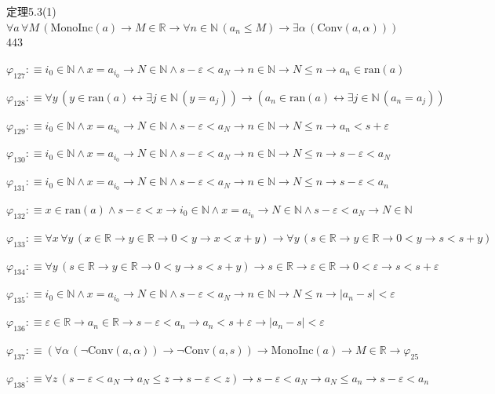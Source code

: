 \begin{fullproof}{定理5.3(1)}{$\forall a\,\forall M\,(\mathrm{MonoInc}(a) \to M \in \mathbb{R} \to \forall n \in \mathbb{N}\,(a_{n} \leq M) \to \exists \alpha\,(\mathrm{Conv}(a,\alpha)))$}{443}
\begin{abbrevlist}
\item $\varphi_{127} :\equiv i_{0} \in \mathbb{N} \land x = a_{i_{0}} \to N \in \mathbb{N} \land s - \varepsilon < a_{N} \to n \in \mathbb{N} \to N \leq n \to a_{n} \in \mathrm{ran}(a)$
\item $\varphi_{128} :\equiv \forall y\,(y \in \mathrm{ran}(a) \leftrightarrow \exists j \in \mathbb{N}\,(y = a_{j})) \to (a_{n} \in \mathrm{ran}(a) \leftrightarrow \exists j \in \mathbb{N}\,(a_{n} = a_{j}))$
\item $\varphi_{129} :\equiv i_{0} \in \mathbb{N} \land x = a_{i_{0}} \to N \in \mathbb{N} \land s - \varepsilon < a_{N} \to n \in \mathbb{N} \to N \leq n \to a_{n} < s + \varepsilon$
\item $\varphi_{130} :\equiv i_{0} \in \mathbb{N} \land x = a_{i_{0}} \to N \in \mathbb{N} \land s - \varepsilon < a_{N} \to n \in \mathbb{N} \to N \leq n \to s - \varepsilon < a_{N}$
\item $\varphi_{131} :\equiv i_{0} \in \mathbb{N} \land x = a_{i_{0}} \to N \in \mathbb{N} \land s - \varepsilon < a_{N} \to n \in \mathbb{N} \to N \leq n \to s - \varepsilon < a_{n}$
\item $\varphi_{132} :\equiv x \in \mathrm{ran}(a) \land s - \varepsilon < x \to i_{0} \in \mathbb{N} \land x = a_{i_{0}} \to N \in \mathbb{N} \land s - \varepsilon < a_{N} \to N \in \mathbb{N}$
\item $\varphi_{133} :\equiv \forall x\,\forall y\,(x \in \mathbb{R} \to y \in \mathbb{R} \to 0 < y \to x < x + y) \to \forall y\,(s \in \mathbb{R} \to y \in \mathbb{R} \to 0 < y \to s < s + y)$
\item $\varphi_{134} :\equiv \forall y\,(s \in \mathbb{R} \to y \in \mathbb{R} \to 0 < y \to s < s + y) \to s \in \mathbb{R} \to \varepsilon \in \mathbb{R} \to 0 < \varepsilon \to s < s + \varepsilon$
\item $\varphi_{135} :\equiv i_{0} \in \mathbb{N} \land x = a_{i_{0}} \to N \in \mathbb{N} \land s - \varepsilon < a_{N} \to n \in \mathbb{N} \to N \leq n \to \lvert a_{n} - s \rvert < \varepsilon$
\item $\varphi_{136} :\equiv \varepsilon \in \mathbb{R} \to a_{n} \in \mathbb{R} \to s - \varepsilon < a_{n} \to a_{n} < s + \varepsilon \to \lvert a_{n} - s \rvert < \varepsilon$
\item $\varphi_{137} :\equiv (\forall \alpha\,(\neg \mathrm{Conv}(a,\alpha)) \to \neg \mathrm{Conv}(a,s)) \to \mathrm{MonoInc}(a) \to M \in \mathbb{R} \to \varphi_{25}$
\item $\varphi_{138} :\equiv \forall z\,(s - \varepsilon < a_{N} \to a_{N} \leq z \to s - \varepsilon < z) \to s - \varepsilon < a_{N} \to a_{N} \leq a_{n} \to s - \varepsilon < a_{n}$

\end{abbrevlist}
\end{fullproof}
